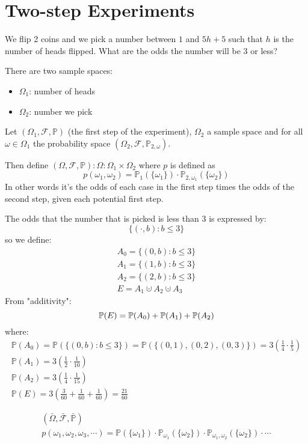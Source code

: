\documentclass[00_complete]{subfiles}
\begin{document}
\section{Two-step Experiments}
\begin{example}
We flip 2 coins and we pick a number between $1$ and $5h+5$ such that $h$ is
the number of heads flipped. What are the odds the number will be $3$ or less?

There are two sample spaces:
\begin{itemize}
    \item $\Omega_1$: number of heads
    \item $\Omega_2$: number we pick
\end{itemize}
Let $(\Omega_1, \mathcal F, \mathbb{P})$ (the first step of the experiment),
$\Omega_2$ a sample space and for all $\omega \in \Omega_1$ the probability
space $(\Omega_2, \mathcal F, \mathbb{P}_{2,\omega})$.

Then define $(\Omega, \mathcal F, \mathbb{P}): \Omega: \Omega_1 \times
\Omega_2$ where $p$ is defined as
$$p(\omega_1,
\omega_2)=\mathbb{P}_1(\{\omega_1\}) \cdot
\mathbb{P}_{2,\omega_1}(\{\omega_2\})$$
In other words it's the odds of each case in the first step times the odds of
the second step, given each potential first step.

The odds that the number that is picked is less than $3$ is expressed by:
$$\{(\cdot,b): b \leq 3\}$$
so we define:
\begin{gather*}
    A_0=\{(0,b):b\leq3\}\\
    A_1=\{(1,b):b\leq3\}\\
    A_2=\{(2,b):b\leq3\}\\
    E=A_1 \cupdot A_2 \cupdot A_3
\end{gather*}
From "additivity":
\[
    \mathbb{P}(E)=\mathbb{P}(A_0)+\mathbb{P}(A_1)+\mathbb{P}(A_2) \\
\]
where:
\begin{gather*}
    \mathbb{P}(A_0)=\mathbb{P}(\{(0,b):b\leq 3\}) =
    \mathbb{P}(\{(0,1),(0,2),(0,3)\})=3\left(\frac{1}{4}\cdot
        \frac{1}{5}\right) \\
    \mathbb{P}(A_1)=3\left(\frac{1}{2}\cdot \frac{1}{10}\right) \\
    \mathbb{P}(A_2)=3\left(\frac{1}{4}\cdot \frac{1}{15}\right) \\
    \mathbb{P}(E)=3 \left( \frac{3}{60}+ \frac{1}{60}+\frac{1}{60}\right) =
    \frac{21}{60}
\end{gather*}

\end{example}
\begin{example}
\begin{gather*}
    (\bar{\Omega}, \bar{\mathcal F}, \bar{\mathbb{P}}) \\
    p(\omega_1, \omega_2,\omega_3, \cdots) =
    \mathbb{P}(\{\omega_1\})\cdot\mathbb{P}_{\omega_1}(\{\omega_2\})\cdot\mathbb{P}_{\omega_1,\omega_2}(\{\omega_2\})\cdot
    \cdots
\end{gather*}
\end{example}
\end{document}
